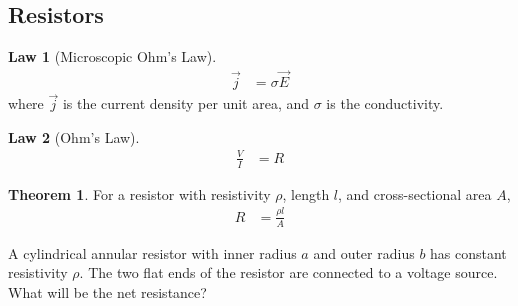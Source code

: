 \documentclass[fleqn, a4paper, 8pt, twoside]{amsart}
\theoremstyle{definition}
\theoremstyle{theorem}
\newtheorem{theorem}{Theorem}
\newtheorem{law}{Law}
\begin{document}
\begin{multicols}{2}
\begin{spacing}{0.6}
\section{Resistors}

\begin{law}[Microscopic Ohm's Law]
	\begin{align*}
		\overrightarrow{j} &= \sigma \overrightarrow{E}
	\end{align*}
	where $\overrightarrow{j}$ is the current density per unit area, and $\sigma$ is the conductivity.
	\label{Microscopic_Ohm's_Law}
\end{law}

\begin{law}[Ohm's Law]
	\begin{align*}
		\frac{V}{I} &= R
	\end{align*}
	\label{Ohm's_Law}
\end{law}

\begin{theorem}
	For a resistor with resistivity $\rho$, length $l$, and cross-sectional area $A$,
	\begin{align*}
		R &= \frac{\rho l}{A}
	\end{align*}
\end{theorem}

\begin{question}
	A cylindrical annular resistor with inner radius $a$ and outer radius $b$ has constant resistivity $\rho$.
	The two flat ends of the resistor are connected to a voltage source.
	What will be the net resistance?
\end{question}


\end{spacing}
\end{multicols}
\end{document}
